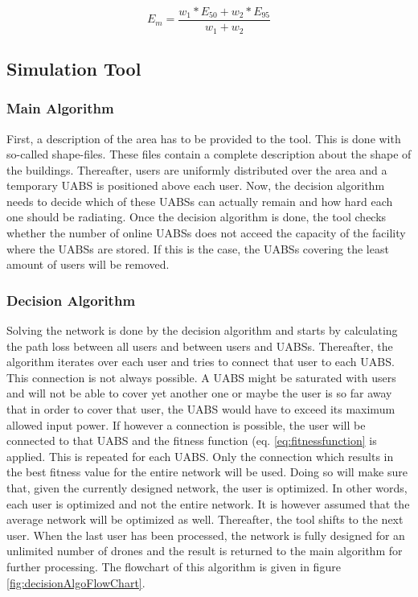 \documentclass[twocolumn]{phdsymp} %
\begin{document}
\begin{equation} 
E_m = \frac{w_1 * E_{50} + w_2 * E_{95}}{w_1 + w_2}
\label{eq:em}
\end{equation}


\subsection{Simulation Tool}

\subsubsection{Main Algorithm}
First, a description of the area has to be provided to the tool. This is done with so-called shape-files.
These  files contain a complete description about the shape of the buildings. Thereafter, users are uniformly
distributed over the area and a temporary \gls{UABS} is positioned above each user. Now, the decision algorithm
needs to decide which of these \gls{UABS}s can actually remain and how hard each one should be radiating. Once the 
decision algorithm is done, the tool checks whether the number of online \gls{UABS}s does not acceed the capacity of 
the facility where the \gls{UABS}s are stored. If this is the case, the \gls{UABS}s covering the least amount of users 
will be removed.

\subsubsection{Decision Algorithm}

Solving the network is done by the decision algorithm and starts by calculating the path loss between all users and between users and \gls{UABS}s.
Thereafter, the algorithm iterates over each user and tries to connect that user to each \gls{UABS}. This connection is not always possible. A \gls{UABS} might be saturated with users and 
will not be able to cover yet another one or maybe the user is so far away that in order to cover that user, the \gls{UABS} would have to exceed its maximum allowed input power.
If however a connection is possible, the user will be connected to that \gls{UABS} and the fitness function (eq. \ref{eq:fitnessfunction} is applied. 
This is repeated for each \gls{UABS}. Only the connection which results in the best fitness value for the entire network will be used.
Doing so will make sure that, given the currently designed network, the user is optimized. In other words, each user is optimized and 
not the entire network. It is however assumed that the average network will be optimized as well.
 Thereafter, the tool shifts to the next user. 
When the last user has been processed, the network is fully designed for an unlimited number of drones and the result is returned to the main algorithm for further processing.
The flowchart of this algorithm is given in figure \ref{fig:decisionAlgoFlowChart}.
\end{document}
